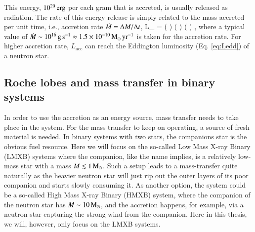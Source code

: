 This energy, $10^{20} \, \mathrm{erg}$ per each gram that is accreted, is usually released as radiation.
The rate of this energy release is simply related to the mass accreted per unit time, i.e., accretion rate $\dot{M} = \Delta M/ \Delta t$, 
\be
L_{} = \Mdot {} \approx {} \left(  \right) \left(  \right) \left(  \right) \ergs,
\ee
where a typical value of $\dot{M} \sim 10^{16} \, \mathrm{g}\,\mathrm{s}^{-1} \approx 1.5 \times 10^{-10} \, \mathrm{M}_{\odot}\,\mathrm{yr}^{-1}$ is taken for the accretion rate.
For higher accretion rate, $L_{\mathrm{acc}}$ can reach the Eddington luminosity (Eq. \eqref{eq:Ledd}) of a neutron star.



\subsection{Roche lobes and mass transfer in binary systems}

In order to use the accretion as an energy source, mass transfer needs to take place in the system.
For the mass transfer to keep on operating, a source of fresh material is needed.
In binary systems with two stars, the companions star is the obvious fuel resource.
Here we will focus on the so-called Low Mass X-ray Binary (LMXB) systems where the companion, like the name implies, is a relatively low-mass star with a mass $M \lesssim 1 \, \mathrm{M}_{\odot}$.\cite{TH06}
Such a setup leads to a mass-transfer quite naturally as the heavier neutron star will just rip out the outer layers of its poor companion and starts slowly consuming it. 
As another option, the system could be a so-called High Mass X-ray Binary (HMXB) system, where the companion of the neutron star has $M \sim 10\, \mathrm{M}_{\odot}$, and the accretion happens, for example, via a neutron star capturing the strong wind from the companion.
Here in this thesis, we will, however, only focus on the LMXB systems.


